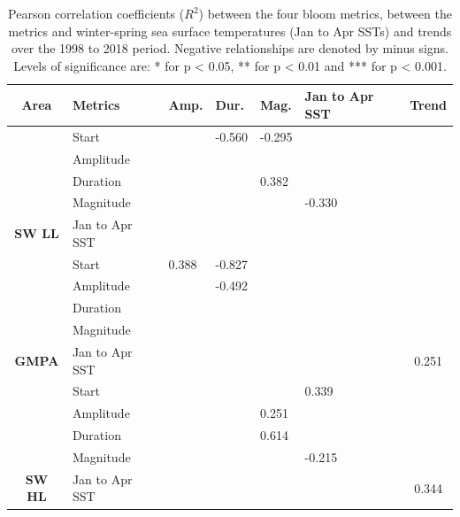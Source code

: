 \documentclass[12pt]{article}\usepackage[]{graphicx}\usepackage[]{color}
\begin{document}
\clearpage
\begin{landscapepage}
\begin{table}

\caption{\label{tab:table6}Pearson correlation coefficients ($R^2$) between the four bloom metrics, between the metrics and winter-spring sea surface temperatures (Jan to Apr SSTs) and trends over the 1998 to 2018 period. Negative relationships are denoted by minus signs. Levels of significance are: * for p < 0.05, ** for p < 0.01 and *** for p < 0.001.}
\centering
\fontsize{12}{14}\selectfont
\begin{tabular}[t]{>{}clllllc}
\toprule
\textbf{Area} & \textbf{Metrics} & \textbf{Amp.} & \textbf{Dur.} & \textbf{Mag.} & \textbf{Jan to Apr SST} & \textbf{Trend}\\
\midrule
 & Start &  & -0.560\text{*}\text{*} & -0.295\text{*}\text{*} &  & \\

 & Amplitude &  &  &  &  & \\

 & Duration &  &  & 0.382\text{*}\text{*} &  & \\

 & Magnitude &  &  &  & -0.330\text{*} & \\

\multirow{-5}{*}{\centering\arraybackslash \textbf{SW LL}} & Jan to Apr SST &  &  &  &  & \\
\cmidrule{1-7}
 & Start & 0.388\text{*}\text{*} & -0.827\text{*}\text{*} &  &  & \\

 & Amplitude &  & -0.492\text{*}\text{*} &  &  & \\

 & Duration &  &  &  &  & \\

 & Magnitude &  &  &  &  & \\

\multirow{-5}{*}{\centering\arraybackslash \textbf{GMPA}} & Jan to Apr SST &  &  &  &  & 0.251\text{*}\\
\cmidrule{1-7}
 & Start &  &  &  & 0.339\text{*}\text{*} & \\

 & Amplitude &  &  & 0.251\text{*} &  & \\

 & Duration &  &  & 0.614\text{*}\text{*} &  & \\

 & Magnitude &  &  &  & -0.215\text{*} & \\

\multirow{-5}{*}{\centering\arraybackslash \textbf{SW HL}} & Jan to Apr SST &  &  &  &  & 0.344\text{*}\text{*}\\
\bottomrule
\end{tabular}
\end{table}
\end{landscapepage}
\end{document}
